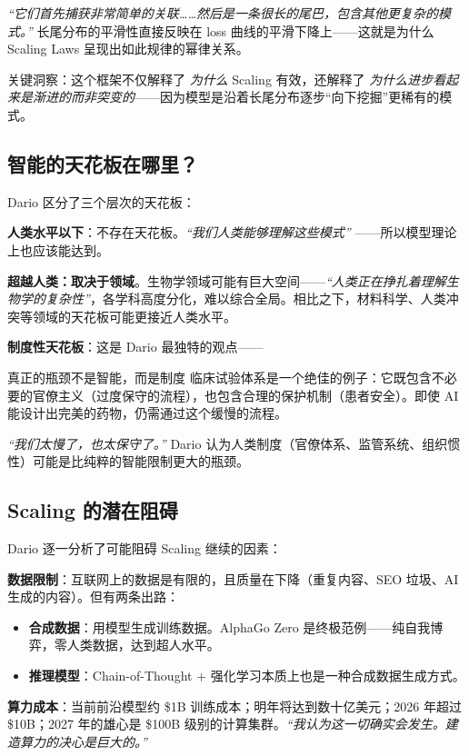 \textit{``它们首先捕获非常简单的关联……然后是一条很长的尾巴，包含其他更复杂的模式。''} 长尾分布的平滑性直接反映在 loss 曲线的平滑下降上——这就是为什么 Scaling Laws 呈现出如此规律的幂律关系。

关键洞察：这个框架不仅解释了 \textit{为什么} Scaling 有效，还解释了 \textit{为什么进步看起来是渐进的而非突变的}——因为模型是沿着长尾分布逐步``向下挖掘''更稀有的模式。

\subsection{智能的天花板在哪里？}

Dario 区分了三个层次的天花板：

\textbf{人类水平以下}：不存在天花板。\textit{``我们人类能够理解这些模式''} ——所以模型理论上也应该能达到。

\textbf{超越人类：取决于领域}。生物学领域可能有巨大空间——\textit{``人类正在挣扎着理解生物学的复杂性''}，各学科高度分化，难以综合全局。相比之下，材料科学、人类冲突等领域的天花板可能更接近人类水平。

\textbf{制度性天花板}：这是 Dario 最独特的观点——

\begin{warningbox}{真正的瓶颈不是智能，而是制度}
临床试验体系是一个绝佳的例子：它既包含不必要的官僚主义（过度保守的流程），也包含合理的保护机制（患者安全）。即使 AI 能设计出完美的药物，仍需通过这个缓慢的流程。

\textit{``我们太慢了，也太保守了。''} Dario 认为人类制度（官僚体系、监管系统、组织惯性）可能是比纯粹的智能限制更大的瓶颈。
\end{warningbox}

\subsection{Scaling 的潜在阻碍}

Dario 逐一分析了可能阻碍 Scaling 继续的因素：

\textbf{数据限制}：互联网上的数据是有限的，且质量在下降（重复内容、SEO 垃圾、AI 生成的内容）。但有两条出路：
\begin{itemize}
    \item \textbf{合成数据}：用模型生成训练数据。AlphaGo Zero 是终极范例——纯自我博弈，零人类数据，达到超人水平。
    \item \textbf{推理模型}：Chain-of-Thought + 强化学习本质上也是一种合成数据生成方式。
\end{itemize}

\textbf{算力成本}：当前前沿模型约 \$1B 训练成本；明年将达到数十亿美元；2026 年超过 \$10B；2027 年的雄心是 \$100B 级别的计算集群。\textit{``我认为这一切确实会发生。建造算力的决心是巨大的。''}

